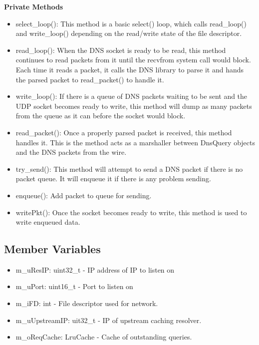 {\bf Private Methods}
\begin{itemize}
\item select\_loop(): This method is a basic select() loop, which calls read\_loop() and write\_loop() depending on the read/write state of the file descriptor.
\item read\_loop(): When the DNS socket is ready to be read, this method continues to read packets from it until the recvfrom system call would block. Each time it reads a packet, it calls the DNS library to parse it and hands the parsed packet to read\_packet() to handle it.
\item write\_loop(): If there is a queue of DNS packets waiting to be sent and the UDP socket becomes ready to write, this method will dump as many packets from the queue as it can before the socket would block.
\item read\_packet(): Once a properly parsed packet is received, this method handles it. This is the method acts as a marshaller between DnsQuery objects and the DNS packets from the wire.
\item try\_send(): This method will attempt to send a DNS packet if there is no packet queue. It will enqueue it if there is any problem sending.
\item enqueue(): Add packet to queue for sending.
\item writePkt(): Once the socket becomes ready to write, this method is used to write enqueued data.
\end{itemize}

\subsection{Member Variables}
\begin{itemize}
\item m\_uResIP: uint32\_t - IP address of IP to listen on
\item m\_uPort: uint16\_t - Port to listen on
\item m\_iFD: int - File descriptor used for network.
\item m\_uUpstreamIP: uit32\_t - IP of upstream caching resolver.
\item m\_oReqCache: LruCache - Cache of outstanding queries.
\end{itemize}
